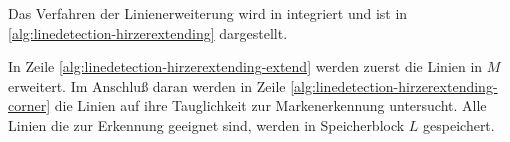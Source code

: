 Das Verfahren der Linienerweiterung wird in  integriert und ist in
 \autoref{alg:linedetection-hirzerextending} dargestellt.

In Zeile \ref{alg:linedetection-hirzerextending-extend} werden zuerst die Linien in $M$ erweitert. Im Anschluß daran
 werden in Zeile \ref{alg:linedetection-hirzerextending-corner} die Linien auf ihre Tauglichkeit zur Markenerkennung
 untersucht. Alle Linien die zur Erkennung geeignet sind, werden in Speicherblock $L$ gespeichert.
